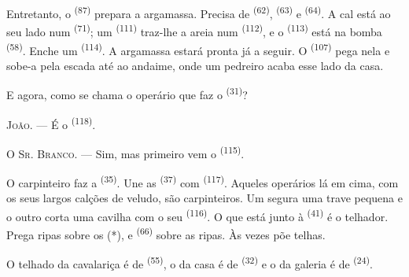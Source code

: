 Entretanto, o  \textsuperscript{(87)} prepara a argamassa.
Precisa de  \textsuperscript{(62)},  \textsuperscript{(63)} e
 \textsuperscript{(64)}. A cal está ao seu lado num 
\textsuperscript{(71)}; um  \textsuperscript{(111)}
traz-lhe a areia num  \textsuperscript{(112)}, e o
 \textsuperscript{(113)} está na bomba \textsuperscript{(58)}. Enche um
 \textsuperscript{(114)}. A argamassa estará pronta já a seguir. O
 \textsuperscript{(107)} pega nela e sobe-a pela escada
até ao andaime, onde um pedreiro acaba esse lado da casa.

E agora, como se chama o operário que faz o 
\textsuperscript{(31)}?

\textsc{João}. --- É o  \textsuperscript{(118)}.

\VUsaut{3.0mm}
\VUsaut{3.0mm}

\textsc{O Sr. Branco}. --- Sim, mas primeiro vem o 
\textsuperscript{(115)}.

O carpinteiro faz a  \textsuperscript{(35)}. Une as 
\textsuperscript{(37)} com  \textsuperscript{(117)}. Aqueles operários
lá em cima, com os seus largos calções de veludo, são carpinteiros. Um
segura uma trave pequena e o outro corta uma cavilha com o seu
 \textsuperscript{(116)}. O que está junto à 
\textsuperscript{(41)} é o telhador. Prega ripas sobre os  (*), e
 \textsuperscript{(66)} sobre as ripas. Às vezes põe telhas.


O telhado da cavalariça é de  \textsuperscript{(55)}, o da casa é
de  \textsuperscript{(32)} e o da galeria é de 
\textsuperscript{(24)}.

